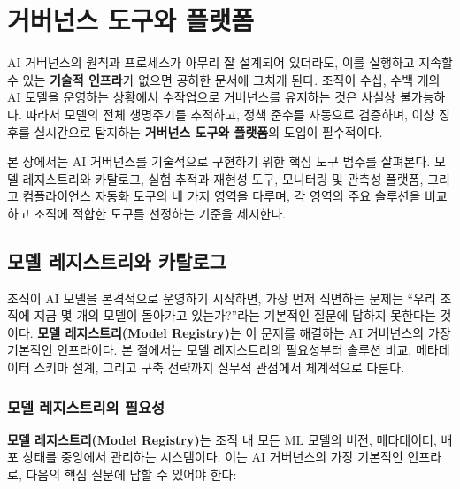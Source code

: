 
\chapter{거버넌스 도구와 플랫폼}
\label{ch:tools_platform}

AI 거버넌스의 원칙과 프로세스가 아무리 잘 설계되어 있더라도, 이를 실행하고 지속할 수 있는 \textbf{기술적 인프라}가 없으면 공허한 문서에 그치게 된다. 조직이 수십, 수백 개의 AI 모델을 운영하는 상황에서 수작업으로 거버넌스를 유지하는 것은 사실상 불가능하다. 따라서 모델의 전체 생명주기를 추적하고, 정책 준수를 자동으로 검증하며, 이상 징후를 실시간으로 탐지하는 \textbf{거버넌스 도구와 플랫폼}의 도입이 필수적이다.

본 장에서는 AI 거버넌스를 기술적으로 구현하기 위한 핵심 도구 범주를 살펴본다. 모델 레지스트리\cite{amershi2019software}와 카탈로그, 실험 추적과 재현성 도구, 모니터링 및 관측성 플랫폼, 그리고 컴플라이언스 자동화 도구의 네 가지 영역을 다루며, 각 영역의 주요 솔루션을 비교하고 조직에 적합한 도구를 선정하는 기준을 제시한다.

\section{모델 레지스트리와 카탈로그}
\label{sec:14.1}

조직이 AI 모델을 본격적으로 운영하기 시작하면, 가장 먼저 직면하는 문제는 ``우리 조직에 지금 몇 개의 모델이 돌아가고 있는가?''라는 기본적인 질문에 답하지 못한다는 것이다. \textbf{모델 레지스트리(Model Registry)}는 이 문제를 해결하는 AI 거버넌스의 가장 기본적인 인프라이다. 본 절에서는 모델 레지스트리의 필요성부터 솔루션 비교, 메타데이터 스키마 설계, 그리고 구축 전략까지 실무적 관점에서 체계적으로 다룬다.

\subsection{모델 레지스트리의 필요성}
\label{sec:14.1.1}

\textbf{모델 레지스트리(Model Registry)}는 조직 내 모든 ML 모델의 버전, 메타데이터, 배포 상태를 중앙에서 관리하는 시스템이다. 이는 AI 거버넌스의 가장 기본적인 인프라로, 다음의 핵심 질문에 답할 수 있어야 한다:

